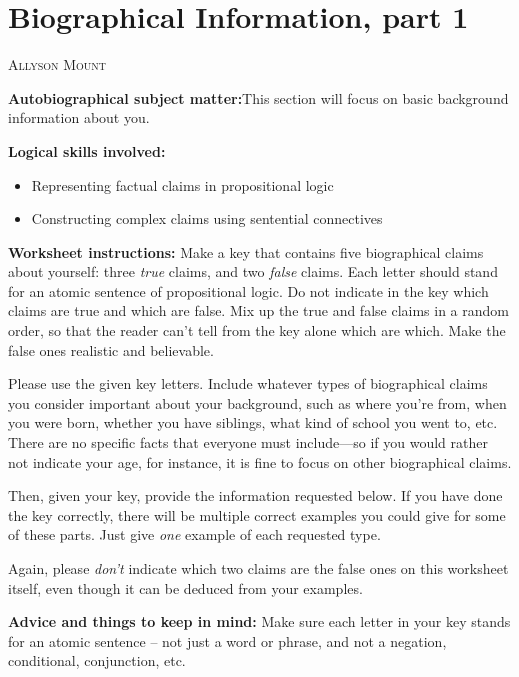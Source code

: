 \documentclass[oneside, openany]{book} %
\makeatletter
\newcommand\chapterauthor[1]{\authortoc{#1}\printchapterauthor{#1}}
\newcommand{\printchapterauthor}[1]{%
 {\parindent0pt\vspace*{-25pt}%
 \linespread{1.1}\large\scshape#1%
 \par\nobreak\vspace*{35pt}}
 \@afterheading%
}
\newcommand{\authortoc}[1]{%
 \addtocontents{toc}{\vskip-10pt}%
 \addtocontents{toc}{%
  \protect\contentsline{chapter}%
  {\hskip1.3em\mdseries\scshape\protect\scriptsize#1}{}{}}
 \addtocontents{toc}{\vskip5pt}%
}
\makeatother
\begin{document}
\chapter{Biographical Information, part 1}
\chapterauthor{Allyson Mount}

\noindent\textbf{Autobiographical subject matter:}This section will focus on basic background information about you.
\vspace{6pt}

\noindent\textbf{Logical skills involved:}

 \begin{itemize}[label=\textbullet, topsep=0pt] 
\item Representing factual claims in propositional logic

\item Constructing complex claims using sentential connectives

\end{itemize}
\vspace{6pt}

\noindent\textbf{Worksheet instructions: }Make a key that contains five biographical claims about yourself: three \textit{true }claims, and two \textit{false }claims. Each letter should stand for an atomic sentence of propositional logic. Do not indicate in the key which claims are true and which are false. Mix up the true and false claims in a random order, so that the reader can't tell from the key alone which are which. Make the false ones realistic and believable.

Please use the given key letters. Include whatever types of biographical claims you consider important about your background, such as where you're from, when you were born, whether you have siblings, what kind of school you went to, etc. There are no specific facts that everyone must include---so if you would rather not indicate your age, for instance, it is fine to focus on other biographical claims.

Then, given your key, provide the information requested below. If you have done the key correctly, there will be multiple correct examples you could give for some of these parts. Just give \textit{one }example of each requested type.

Again, please \textit{don't }indicate which two claims are the false ones on this worksheet itself, even though it can be deduced from your examples.
\vspace{6pt}

\noindent\textbf{Advice and things to keep in mind: }Make sure each letter in your key stands for an atomic sentence -- not just a word or phrase, and not a negation, conditional, conjunction, etc.
\vspace{6pt}
\end{document}
